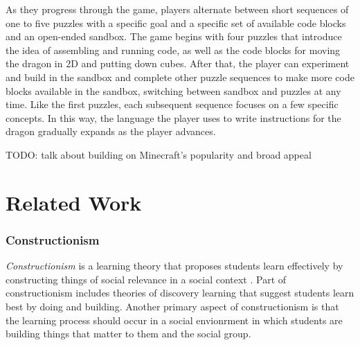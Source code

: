 \documentclass{sig-alternate}
\newcommand{\TODO}[1]{{\color{red} TODO: #1}}
\newcommand{\gametitle}{{\color{RoyalPurple} Dragon Architect Academy}}
\begin{document}
As they progress through the game, players alternate between short sequences of one to five puzzles with a specific goal and a specific set of available code blocks and an open-ended sandbox. 
The game begins with four puzzles that introduce the idea of assembling and running code, as well as the code blocks for moving the dragon in 2D and putting down cubes.
After that, the player can experiment and build in the sandbox and complete other puzzle sequences to make more code blocks available in the sandbox, switching between sandbox and puzzles at any time. 
Like the first puzzles, each subsequent sequence focuses on a few specific concepts. 
In this way, the language the player uses to write instructions for the dragon gradually expands as the player advances.

\TODO{talk about building on Minecraft's popularity and broad appeal}





\section{Related Work}


\subsubsection{Constructionism}
\emph{Constructionism} is a learning theory that proposes students learn effectively by constructing things of social relevance in a social context \cite{kafai06constructionism}.
Part of constructionism includes theories of discovery learning that suggest students learn best by doing and building.
Another primary aspect of constructionism is that the learning process should occur in a social envionrment in which students are building things that matter to them and the social group.
\end{document}

